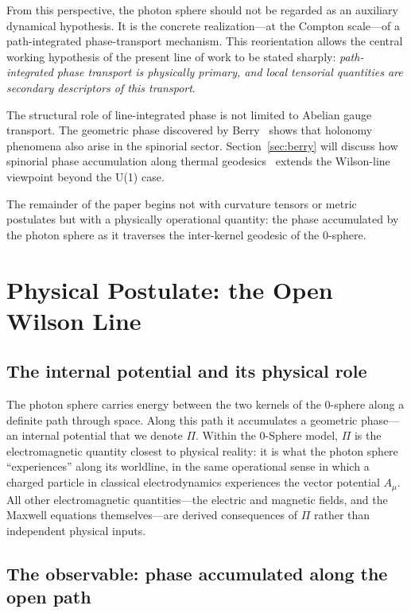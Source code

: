 \documentclass[%
 reprint, amsmath,amssymb, aps, prb, ]{revtex4-2}
\numberwithin{equation}{section}
\begin{document}
From this perspective, the photon sphere should not be regarded as an auxiliary dynamical hypothesis. It is the concrete realization---at the Compton scale---of a path-integrated phase-transport mechanism. This reorientation allows the central working hypothesis of the present line of work to be stated sharply: \emph{path-integrated phase transport is physically primary, and local tensorial quantities are secondary descriptors of this transport}.

The structural role of line-integrated phase is not limited to Abelian gauge transport. The geometric phase discovered by Berry~\cite{Berry1984} shows that holonomy phenomena also arise in the spinorial sector. Section~\ref{sec:berry} will discuss how spinorial phase accumulation along thermal geodesics~\cite{hanamura24,hanamura26} extends the Wilson-line viewpoint beyond the U(1) case.

The remainder of the paper begins not with curvature tensors or metric postulates but with a physically operational quantity: the phase accumulated by the photon sphere as it traverses the inter-kernel geodesic of the 0-sphere.

\section{Physical Postulate: the Open Wilson Line}
\label{sec:postulate}

\subsection{The internal potential and its physical role}

The photon sphere carries energy between the two kernels of the 0-sphere along a definite path through space. Along this path it accumulates a geometric phase---an internal potential that we denote $\Pi$. Within the 0-Sphere model, $\Pi$ is the electromagnetic quantity closest to physical reality: it is what the photon sphere ``experiences'' along its worldline, in the same operational sense in which a charged particle in classical electrodynamics experiences the vector potential $A_\mu$. All other electromagnetic quantities---the electric and magnetic fields, and the Maxwell equations themselves---are derived consequences of $\Pi$ rather than independent physical inputs.

\subsection{The observable: phase accumulated along the open path}
\label{sec:obs}
\end{document}
